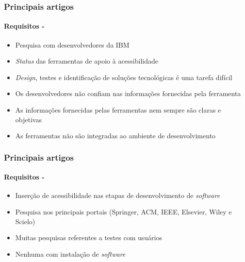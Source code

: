 \documentclass{beamer}
\begin{document}
\begin{frame}
\frametitle{Principais artigos}
\framesubtitle{Requisitos - \citet{Trewin:2010:ACT:1805986.1806029}}

\begin{itemize}
  \item Pesquisa com desenvolvedores da IBM
  \item \textit{Status} das ferramentas de apoio à acessibilidade
  \item \textit{Design}, testes e identificação de soluções tecnológicas é uma tarefa difícil
  \item Os desenvolvedores não confiam nas informações fornecidas pela ferramenta
  \item As informações fornecidas pelas ferramentas nem sempre são claras e objetivas
  \item As ferramentas não são integradas ao ambiente de desenvolvimento
\end{itemize}

\end{frame}

\begin{frame}
\frametitle{Principais artigos}
\framesubtitle{Requisitos - \citet{analuizadias:2010}}

\begin{itemize}
  \item Inserção de acessibilidade nas etapas de desenvolvimento de \textit{software}
  \item Pesquisa nos principais portais (Springer, ACM, IEEE, Elsevier, Wiley e Scielo)
  \item Muitas pesquisas referentes a testes com usuários
  \item Nenhuma com instalação de \textit{software}
\end{itemize}

\end{frame}
\end{document}

